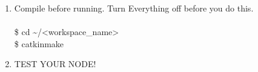 \documentclass[12pt]{article}
\newcommand{\R}{\color{red}}
\newcommand{\K}{\color{black}}
\newcommand{\wspname}{\R<workspace\_name>\K}
\newcommand{\home}{\textasciitilde/}
\begin{document}
\begin{enumerate}
    \item Compile before running. Turn Everything off before you do this.\\\\
    {\selectfont  \hspace{5mm} \$ cd \home\wspname }\\
    {\selectfont  \hspace{5mm} \$ catkin\textunderscore make } 
    \item TEST YOUR NODE!
    
\end{enumerate}
\end{document}
